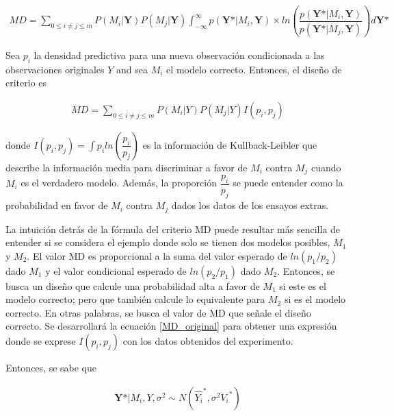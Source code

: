 \begin{equation*}
	\begin{aligned}
		MD = \sum_{0 \leq i \neq j \leq m} P(M_i | \textbf{Y}) P(M_j | \textbf{Y}) \int_{-\infty}^{\infty} p(\textbf{Y*} | M_i, \textbf{Y}) \times ln(\dfrac{p(\textbf{Y*} | M_i, \textbf{Y})}{p(\textbf{Y*} | M_j, \textbf{Y})}) d\textbf{Y*}
	\end{aligned}
\end{equation*}

Sea $p_i$ la densidad predictiva para una nueva observación condicionada a las observaciones originales $Y$ and sea $M_i$ el modelo correcto. Entonces, el diseño de criterio es 

\begin{equation} \label{MD_original}
	\begin{aligned}
		MD = \sum_{0 \leq i \neq j \leq m} P(M_i | Y)  P(M_j | Y) I(p_i, p_j)
	\end{aligned}
\end{equation}

\noindent donde $I(p_i, p_j) = \int p_i ln(\dfrac{p_i}{p_j})$ es la información de Kullback-Leibler que describe la información media para discriminar a favor de $M_i$ contra $M_j$ cuando $M_i$ es el verdadero modelo. Además, la proporción $\dfrac{p_i}{p_j}$ se puede entender como la probabilidad en favor de $M_i$ contra $M_j$ dados los datos de los ensayos extras. 

La intuición detrás de la fórmula del criterio MD puede resultar más sencilla de entender si se considera el ejemplo donde solo se tienen dos modelos posibles, $M_1$ y $M_2$. El valor MD es proporcional a la suma del valor esperado de $ln(p_1/p_2)$ dado $M_1$ y el valor condicional esperado de  $ln(p_2/p_1)$ dado $M_2$. Entonces, se busca un diseño que calcule una probabilidad alta a favor de $M_1$ si este es el modelo correcto; pero que también calcule lo equivalente para $M_2$ si es el modelo correcto. En otras palabras, se busca el valor de MD que señale el diseño correcto. Se desarrollará la ecuación \ref{MD_original} para obtener una expresión donde se exprese $I(p_i, p_j)$ con los datos obtenidos del experimento. 

Entonces, se sabe que

\begin{equation*}
	\begin{aligned}
		\textbf{Y*} | M_i, Y, \sigma^{2} \sim N(\hat{{Y_i}}^{*}, \sigma^{2} {V_i}^{*})
	\end{aligned}
\end{equation*}

